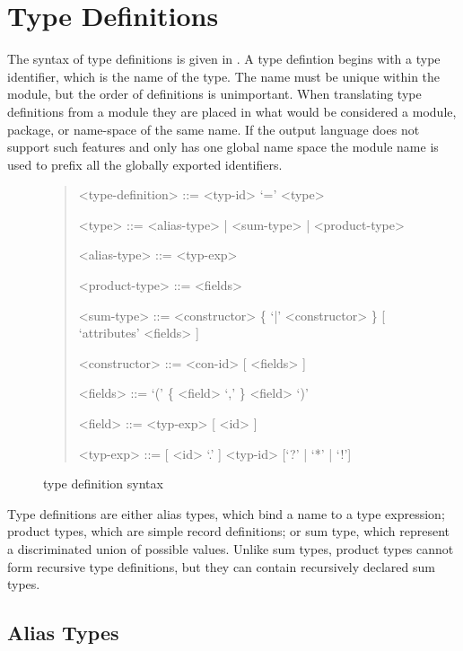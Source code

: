 \section{Type Definitions}

The syntax of type definitions is given in .
A type defintion begins with a type identifier, which is the name of the type.
The name must be unique within the module, but the order of definitions is unimportant.
When translating type definitions from a module they are placed in what would be considered a
module, package, or name-space of the same name.
If the output language does not support such features and only has one global
name space the module name
is used to prefix all the globally exported identifiers.

\begin{figure}[t]
  \begin{quote}
    \begin{grammar}
      <type-definition>  ::=  <typ-id> `=' <type>

      <type>         ::= <alias-type> | <sum-type> | <product-type>

      <alias-type>   ::= <typ-exp>
      
      <product-type> ::= <fields>

      <sum-type>     ::= <constructor> \{ `|' <constructor> \} [ `attributes' <fields> ]

      <constructor>  ::= <con-id> [ <fields> ]

      <fields>       ::= `(' \{ <field>  `,' \} <field> `)'

      <field>        ::=  <typ-exp> [ <id> ]
      
      <typ-exp>      ::= [ <id> `.' ] <typ-id> [`?' | `*' | `!']
    \end{grammar}
  \end{quote}
  \caption{\asdl{} type definition syntax}
  \label{fig:type-syntax}
\end{figure}%

Type definitions are either alias types, which bind a name to a type expression;
product types, which are simple record definitions;
or sum type, which represent a discriminated union of possible values.
Unlike sum types, product types cannot form recursive type definitions, but they can
contain recursively declared sum types.

\subsection{Alias Types}

